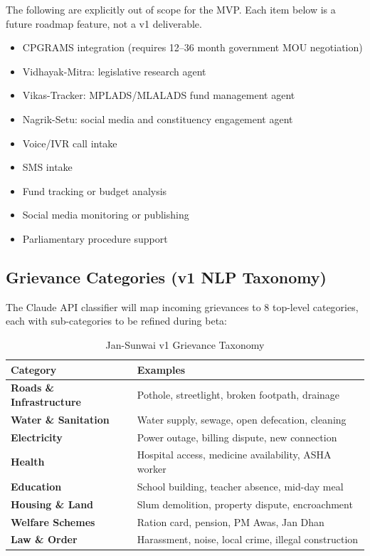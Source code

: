 \documentclass[12pt, a4paper]{article}
\begin{document}
The following are explicitly out of scope for the MVP. Each item below is a future roadmap feature, not a v1 deliverable.

\begin{itemize}[leftmargin=1.5em, itemsep=0.2em]
    \item CPGRAMS integration (requires 12--36 month government MOU negotiation)
    \item Vidhayak-Mitra: legislative research agent
    \item Vikas-Tracker: MPLADS/MLALADS fund management agent
    \item Nagrik-Setu: social media and constituency engagement agent
    \item Voice/IVR call intake
    \item SMS intake
    \item Fund tracking or budget analysis
    \item Social media monitoring or publishing
    \item Parliamentary procedure support
\end{itemize}

\subsection{Grievance Categories (v1 NLP Taxonomy)}

The Claude API classifier will map incoming grievances to 8 top-level categories, each with sub-categories to be refined during beta:

\begin{table}[ht]
\centering
\caption{Jan-Sunwai v1 Grievance Taxonomy}
\renewcommand{\arraystretch}{1.3}
\begin{tabularx}{\textwidth}{>{\bfseries}p{3cm} X}
\toprule
\rowcolor{pollitylightblue}
\textbf{Category} & \textbf{Examples} \\
\midrule
Roads \& Infrastructure & Pothole, streetlight, broken footpath, drainage \\
Water \& Sanitation     & Water supply, sewage, open defecation, cleaning \\
Electricity             & Power outage, billing dispute, new connection \\
Health                  & Hospital access, medicine availability, ASHA worker \\
Education               & School building, teacher absence, mid-day meal \\
Housing \& Land         & Slum demolition, property dispute, encroachment \\
Welfare Schemes         & Ration card, pension, PM Awas, Jan Dhan \\
Law \& Order            & Harassment, noise, local crime, illegal construction \\
\bottomrule
\end{tabularx}
\end{table}
\end{document}
